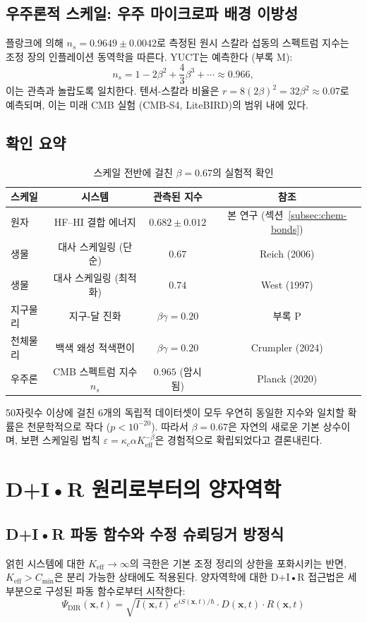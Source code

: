 \documentclass[11pt,a4paper]{article}
\begin{document}
\subsection{우주론적 스케일: 우주 마이크로파 배경 이방성}
\label{subsec:cmb}

플랑크에 의해 $n_s = 0.9649 \pm 0.0042$로 측정된 원시 스칼라 섭동의 스펙트럼 지수는 조정 장의 인플레이션 동역학을 따른다. YUCT는 예측한다 (부록 M):
\[
n_s = 1 - 2\beta^2 + \frac{4}{3}\beta^3 + \cdots \approx 0.966,
\]
이는 관측과 놀랍도록 일치한다. 텐서-스칼라 비율은 $r = 8(2\beta)^2 = 32\beta^2 \approx 0.07$로 예측되며, 이는 미래 CMB 실험 (CMB‑S4, LiteBIRD)의 범위 내에 있다.

\subsection{확인 요약}

\begin{table}[h]
\centering
\caption{스케일 전반에 걸친 $\beta = 0.67$의 실험적 확인}
\label{tab:confirmations}
\begin{tabular}{lccc}
	\toprule
	스케일 & 시스템 & 관측된 지수 & 참조 \\
	\midrule
	원자 & HF–HI 결합 에너지 & $0.682 \pm 0.012$ & 본 연구 (섹션~\ref{subsec:chem-bonds}) \\
	생물 & 대사 스케일링 (단순) & $0.67$ & Reich (2006) \\
	생물 & 대사 스케일링 (최적화) & $0.74$ & West (1997) \\
	지구물리 & 지구-달 진화 & $\beta\gamma = 0.20$ & 부록 P \\
	천체물리 & 백색 왜성 적색편이 & $\beta\gamma = 0.20$ & Crumpler (2024) \\
	우주론 & CMB 스펙트럼 지수 $n_s$ & $0.965$ (암시됨) & Planck (2020) \\
	\bottomrule
\end{tabular}
\end{table}

50자릿수 이상에 걸친 6개의 독립적 데이터셋이 모두 우연히 동일한 지수와 일치할 확률은 천문학적으로 작다 ($p < 10^{-20}$). 따라서 $\beta = 0.67$은 자연의 새로운 기본 상수이며, 보편 스케일링 법칙 $\varepsilon = \kappa_c \alpha K_{\mathrm{eff}}^{-\beta}$은 경험적으로 확립되었다고 결론내린다.

\section{D+I•R 원리로부터의 양자역학}
\subsection{D+I•R 파동 함수와 수정 슈뢰딩거 방정식}
얽힌 시스템에 대한 $K_{\mathrm{eff}} \to \infty$의 극한은 기본 조정 정리의 상한을 포화시키는 반면, $K_{\mathrm{eff}} > C_{\min}$은 분리 가능한 상태에도 적용된다. 양자역학에 대한 D+I•R 접근법은 세 부분으로 구성된 파동 함수로부터 시작한다:
\begin{equation}
\Psi_{\text{DIR}}(\mathbf{x},t) = \sqrt{I(\mathbf{x},t)} \ e^{iS(\mathbf{x},t)/\hbar} \cdot D(\mathbf{x},t) \cdot R(\mathbf{x},t)
\end{equation}
\end{document}
